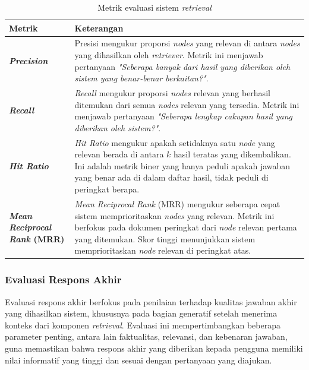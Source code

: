 \begin{table}[H]
	\centering
	\caption{Metrik evaluasi sistem \textit{retrieval} }
	\label{tab:retrieval-evaluation-metrics}
	\begin{tabular}{|p{}|p{}|}
		\hline
		\textbf{Metrik}                              & \textbf{Keterangan}                                                                                                                                                                                                                                    \\
		\hline
		\textbf{\textit{Precision}}                  &
		Presisi mengukur proporsi \textit{nodes} yang relevan di antara \textit{nodes} yang dihasilkan oleh \textit{retriever}. Metrik ini menjawab pertanyaan \textit{"Seberapa banyak dari hasil yang diberikan oleh sistem yang benar-benar berkaitan?"}.                                                  \\
		\hline
		\textbf{\textit{Recall}}                     &
		\textit{Recall} mengukur proporsi \textit{nodes} relevan yang berhasil ditemukan dari semua \textit{nodes} relevan yang tersedia. Metrik ini menjawab pertanyaan \textit{"Seberapa lengkap cakupan hasil yang diberikan oleh sistem?"}.                                                               \\
		\hline
		\textbf{\textit{Hit Ratio}}                  &
		\textit{Hit Ratio} mengukur apakah setidaknya satu \textit{node} yang relevan berada di antara $k$ hasil teratas yang dikembalikan. Ini adalah metrik biner yang hanya peduli apakah jawaban yang benar ada di dalam daftar hasil, tidak peduli di peringkat berapa.                                  \\
		\hline
		\textbf{\textit{Mean Reciprocal Rank} (MRR)} &
		\textit{Mean Reciprocal Rank} (MRR) mengukur seberapa cepat sistem memprioritaskan \textit{nodes} yang relevan. Metrik ini berfokus pada dokumen peringkat dari \textit{node} relevan pertama yang ditemukan. Skor tinggi menunjukkan sistem memprioritaskan \textit{node} relevan di peringkat atas. \\
		\hline
	\end{tabular}
\end{table}

\subsubsection{Evaluasi Respons Akhir}
Evaluasi respons akhir berfokus pada penilaian terhadap kualitas jawaban akhir yang dihasilkan sistem, khususnya pada bagian generatif setelah menerima konteks dari komponen \textit{retrieval}.
Evaluasi ini mempertimbangkan beberapa parameter penting, antara lain faktualitas, relevansi, dan kebenaran jawaban, guna memastikan bahwa respons akhir yang diberikan kepada pengguna memiliki nilai informatif yang tinggi dan sesuai dengan pertanyaan yang diajukan.

